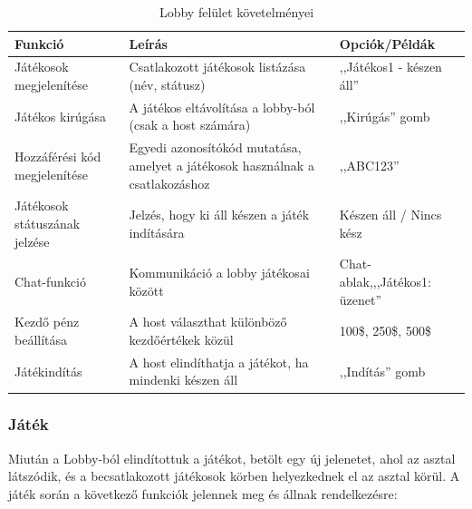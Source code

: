 \documentclass[]{thesis-ekf}
\theoremstyle{definition}
\theoremstyle{remark}
\begin{document}
\begin{table}[ht!]
	\centering
	\footnotesize
	\begin{tabular}{|p{4cm}|p{7cm}|p{4cm}|}
		\hline
		\textbf{Funkció} & \textbf{Leírás} & \textbf{Opciók/Példák} \\ 
		\hline
		Játékosok megjelenítése & Csatlakozott játékosok listázása (név, státusz) & ,,Játékos1 - készen áll'' \\ 
		\hline
		Játékos kirúgása & A játékos eltávolítása a lobby-ból (csak a host számára) & ,,Kirúgás'' gomb \\ 
		\hline
		Hozzáférési kód megjelenítése & Egyedi azonosítókód mutatása, amelyet a játékosok használnak a csatlakozáshoz & ,,ABC123'' \\ 
		\hline
		Játékosok státuszának jelzése & Jelzés, hogy ki áll készen a játék indítására & Készen áll / Nincs kész \\ 
		\hline
		Chat-funkció & Kommunikáció a lobby játékosai között & Chat-ablak,\newline,,Játékos1: üzenet'' \\ 
		\hline
		Kezdő pénz beállítása & A host választhat különböző kezdőértékek közül & 100\$, 250\$, 500\$ \\ 
		\hline
		Játékindítás & A host elindíthatja a játékot, ha mindenki készen áll & ,,Indítás'' gomb \\ 
		\hline
	\end{tabular}
	\caption{Lobby felület követelményei}
\end{table}

\subsubsection{Játék}

Miután a Lobby-ból elindítottuk a játékot, betölt egy új jelenetet, ahol az asztal látszódik, és a becsatlakozott játékosok körben helyezkednek el az asztal körül. A játék során a következő funkciók jelennek meg és állnak rendelkezésre:
\end{document}
